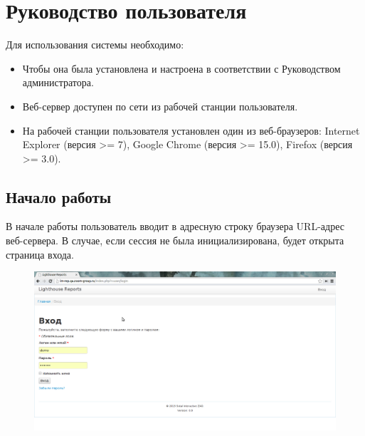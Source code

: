 
\section{Руководство пользователя}

Для использования системы необходимо:
\begin{itemize}
\item{
 Чтобы она была установлена и настроена в соответствии с Руководством администратора.
}
\item{
 Веб-сервер доступен по сети из рабочей станции пользователя.
}
\item{
 На рабочей станции пользователя установлен один из веб-браузеров: 
Internet Explorer (версия >= 7), Google Chrome (версия >= 15.0), Firefox (версия >= 3.0).
}
\end{itemize}


\subsection*{Начало работы}

В начале работы пользователь вводит в адресную строку браузера URL-адрес веб-сервера.
В случае, если сессия не была инициализирована, будет открыта страница входа.

\begin{figure}[!ht]
\begin{center}
\hspace*{-1cm} \includegraphics[scale=0.35, trim=0mm 0mm 0mm 10mm, clip]{../resources/screens/login.png}
\end{center}
\end{figure}

